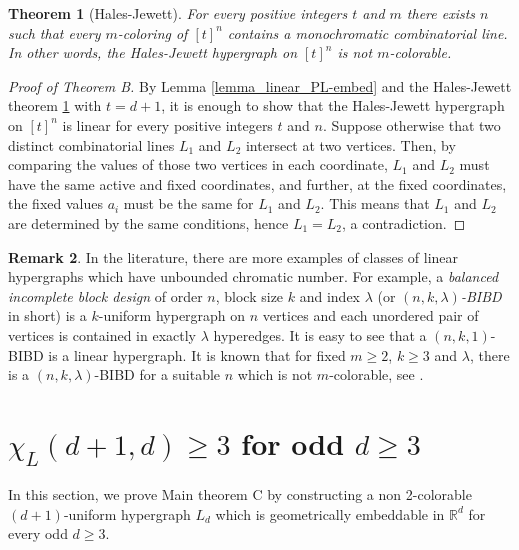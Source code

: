 \documentclass{article}
\newcommand{\RR}{\mathbb{R}}
\newtheorem{thm}{Theorem}[section]
\theoremstyle{definition}
\newtheorem{remark}[thm]{Remark}
\begin{document}
\begin{thm}[Hales-Jewett] \label{thm_Hales-Jewett}
	For every positive integers $t$ and $m$ there exists $n$ such that every $m$-coloring of $[t]^n$ contains a monochromatic combinatorial line. In other words, the Hales-Jewett hypergraph on $[t]^n$ is not $m$-colorable.
\end{thm}

\begin{proof}[Proof of Theorem B]
	By Lemma \ref{lemma_linear_PL-embed} and the Hales-Jewett theorem \ref{thm_Hales-Jewett} with $t=d+1$, it is enough to show that the Hales-Jewett hypergraph on $[t]^n$ is linear for every positive integers $t$ and $n$. Suppose otherwise that two distinct combinatorial lines $L_1$ and $L_2$ intersect at two vertices. Then, by comparing the values of those two vertices in each coordinate, $L_1$ and $L_2$ must have the same active and fixed coordinates, and further, at the fixed coordinates, the fixed values $a_i$ must be the same for $L_1$ and $L_2$. This means that $L_1$ and $L_2$ are determined by the same conditions, hence $L_1=L_2$, a contradiction.
\end{proof}

\begin{remark} \label{remark_more_linear_hypergraphs}
	In the literature, there are more examples of classes of linear hypergraphs which have unbounded chromatic number. For example, a \textit{balanced incomplete block design}  of order $n$, block size $k$ and index $\lambda$ (or \textit{$(n,k,\lambda)$-BIBD} in short) is a $k$-uniform hypergraph on $n$ vertices and each unordered pair of vertices is contained in exactly $\lambda$ hyperedges. It is easy to see that a $(n,k,1)$-BIBD is a linear hypergraph. It is known that for fixed $m \geq 2$, $k \geq 3$ and $\lambda$, there is a $(n,k,\lambda)$-BIBD for a suitable $n$ which is not $m$-colorable, see \cite{BIBD_coloring_Horsley-Pike, BIBD_blocksize_4, BIBD_steiner_triple}.
\end{remark}


\section{\texorpdfstring{$\chi_L(d+1,d)\geq 3$}{XL(d+1,d)>=3} for odd \texorpdfstring{$d \geq 3$}{d>=3}}
\label{section_full_dimension-geometric}
In this section, we prove Main theorem C by constructing a non 2-colorable $(d+1)$-uniform hypergraph $L_d$ which is geometrically embeddable in $\RR^d$ for every odd $d \geq 3$. 
\end{document}
